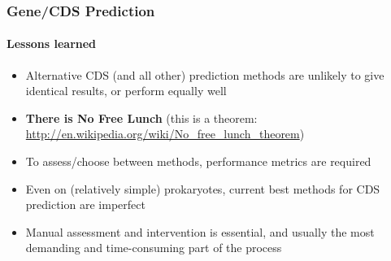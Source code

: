 \begin{frame}
   \frametitle{Gene/CDS Prediction}   
   \framesubtitle{Lessons learned}   
   \begin{itemize}
     \item Alternative CDS (and all other) prediction methods are unlikely to give identical results, or perform equally well
     \item \textbf{There is No Free Lunch} (this is a theorem: \href{http://en.wikipedia.org/wiki/No_free_lunch_theorem}{http://en.wikipedia.org/wiki/No\_free\_lunch\_theorem})
     \item To assess/choose between methods, performance metrics are required
     \item Even on (relatively simple) prokaryotes, current best methods for CDS prediction are imperfect
     \item Manual assessment and intervention is essential, and usually the most demanding and time-consuming part of the process
   \end{itemize}
\end{frame}
